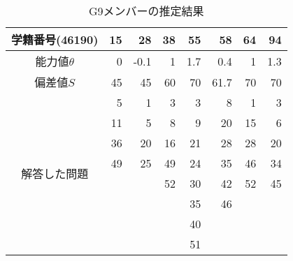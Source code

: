 \documentclass[12pt]{jarticle}
\begin{document}
\begin{table}[htb]
    \begin{center}
        \caption{G9メンバーの推定結果}
        \begin{tabular}{|c|r|r|r|r|r|r|r|}
            \hline
            学籍番号(46190)               & 15 & 28   & 38 & 55  & 58   & 64 & 94  \\
            \hline
            能力値$\theta$                & 0  & -0.1 & 1  & 1.7 & 0.4  & 1  & 1.3 \\
            \hline
            偏差値$S$                     & 45 & 45   & 60 & 70  & 61.7 & 70 & 70  \\
            \hline
            \multirow{8}{*}{解答した問題} & 5  & 1    & 3  & 3   & 8    & 1  & 3   \\
                                          & 11 & 5    & 8  & 9   & 20   & 15 & 6   \\
                                          & 36 & 20   & 16 & 21  & 28   & 28 & 20  \\
                                          & 49 & 25   & 49 & 24  & 35   & 46 & 34  \\
                                          &    &      & 52 & 30  & 42   & 52 & 45  \\
                                          &    &      &    & 35  & 46   &    &     \\
                                          &    &      &    & 40  &      &    &     \\
                                          &    &      &    & 51  &      &    &     \\
            \hline
        \end{tabular}
    \end{center}
\end{table}



\clearpage
\appendix
\end{document}

